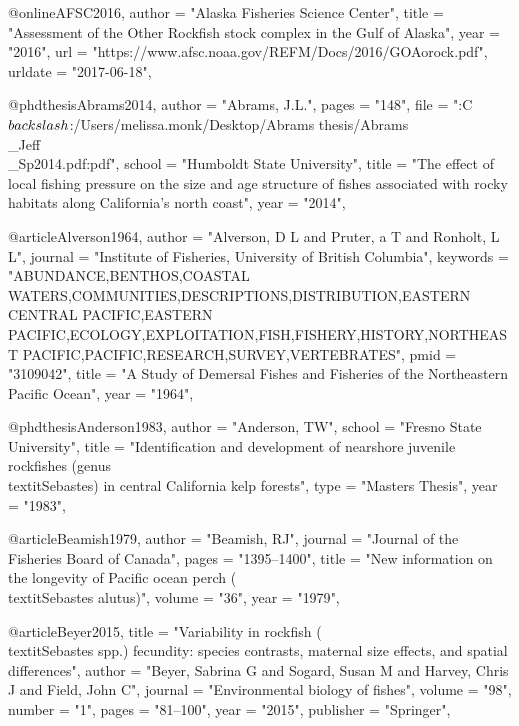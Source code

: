 @online{AFSC2016,
    author = "{Alaska Fisheries Science Center}",
    title = "{{Assessment of the Other Rockfish stock complex in the Gulf of Alaska}}",
    year = "2016",
    url = "{https://www.afsc.noaa.gov/REFM/Docs/2016/GOAorock.pdf}",
    urldate = "{2017-06-18}",
}

@phdthesis{Abrams2014,
    author = "{Abrams, J.L.}",
    pages = "{148}",
    file = "{:C$\\backslash$:/Users/melissa.monk/Desktop/Abrams thesis/Abrams\\_Jeff\\_Sp2014.pdf:pdf}",
    school = "{Humboldt State University}",
    title = "{{The effect of local fishing pressure on the size and age structure of fishes associated with rocky habitats along California's north coast}}",
    year = "{2014}",
}

@article{Alverson1964,
    author = "{Alverson, D L and Pruter, a T and Ronholt, L L}",
    journal = "{Institute of Fisheries, University of British Columbia}",
    keywords = "{ABUNDANCE,BENTHOS,COASTAL WATERS,COMMUNITIES,DESCRIPTIONS,DISTRIBUTION,EASTERN CENTRAL PACIFIC,EASTERN PACIFIC,ECOLOGY,EXPLOITATION,FISH,FISHERY,HISTORY,NORTHEAST PACIFIC,PACIFIC,RESEARCH,SURVEY,VERTEBRATES}",
    pmid = "{3109042}",
    title = "{{A Study of Demersal Fishes and Fisheries of the Northeastern Pacific Ocean}}",
    year = "{1964}",
}

@phdthesis{Anderson1983,
    author = "{Anderson, TW}",
    school = "{Fresno State University}",
    title = "{{Identification and development of nearshore juvenile rockfishes (genus \\textit{{Sebastes}}) in central California kelp forests}}",
    type = "{Masters Thesis}",
    year = "{1983}",
}

@article{Beamish1979,
    author = "{Beamish, RJ}",
    journal = "{Journal of the Fisheries Board of Canada}",
    pages = "{1395--1400}",
    title = "{{New information on the longevity of Pacific ocean perch (\\textit{{Sebastes} alutus})}}",
    volume = "{36}",
    year = "{1979}",
}

@article{Beyer2015,
    title = "{Variability in rockfish (\\textit{{Sebastes}} spp.) fecundity: species contrasts, maternal size effects, and spatial differences}",
    author = "{Beyer, Sabrina G and Sogard, Susan M and Harvey, Chris J and Field, John C}",
    journal = "{Environmental biology of fishes}",
    volume = "{98}",
    number = "{1}",
    pages = "{81--100}",
    year = "{2015}",
    publisher = "{Springer}",
}

